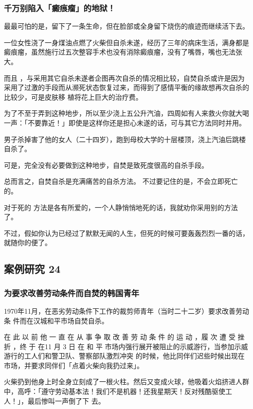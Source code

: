 \documentclass[UTF8]{ctexart}
\begin{document}
\subsubsection*{千万别陷入「癜痕瘤」的地狱！}

最最可怕的是，留下了一条生命，但在脸部或全身留下烧伤的痕迹而继续活下去。

一位女性浇了一身煤油点燃了火柴但自杀未遂，经历了三年的病床生活，满身都是癜痕瘤，虽然施行过五次整容手术也没有消除癜痕瘤，没有了嘴唇，嘴也无法张大。

而且 ，与采用其它自杀未遂者企图再次自杀的情况相比较，自焚自杀或许是因为采用了过激的手段而从濒死状态恢复过来，而得到了感情平衡的缘故想再次自杀的比较少，可是皮肤移 植将花上巨大的治疗费。

为了不至于弄到这种地步，所以至少浇上五公升汽油，四周如有人来救火你就大喝一声：「不要靠近！」即使是这样你还是担心未遂的话，可与其它方法同时并用。

男子杀掉害了他的女人（二十四岁），跑到母校大学的十层楼顶，浇上汽油后跳楼自杀了。

可是，完全没有必要做到这种地步，自焚是致死度很高的自杀手段。

总而言之，自焚自杀是充满痛苦的自杀方法。
不过要记住的是，不会立即死亡的。

对于死的 方法是各有所爱的，一个人静悄悄地死的话，我就劝你采用别的方法了。

不过，假如你认为已经过了默默无闻的人生，但死的时候可要轰轰烈烈一番的话，就随你的便了。


\subsection{案例研究 24}

\subsubsection*{为要求改善劳动条件而自焚的韩国青年}

1970年11月，在恶劣劳动条件下工作的裁剪师青年（当时二十二岁）要求改善劳动条
件而在汉城和平市场自焚自杀。

在 此 以 前 他 一 直 在 从 事 争 取 改 善 劳 动 条 件 的 运 动 ，履 次 遭 受 挫 折 ，终 于 在11 月 3 日 在 和 平 市场内强行展开被阻止的示威游行，当参加示威游行的工人们和警卫队、警察部队激烈冲突 的时候，他比同伴们迟些时候出现在市场，并要求同伴们「点着火柴向我扔过来」。

火柴扔到他身上时全身立刻成了一根火柱。然后又变成火球，他吸着火焰挤进人群中，高呼：「遵守劳动基本法！我们不是机器！还我星期天！反对残酷驱使工人！」，最后惨叫一声倒了下 去。
\end{document}
